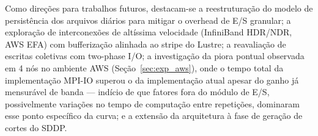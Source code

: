\documentclass[12pt]{article}
\begin{document}

Como direções para trabalhos futuros, destacam-se a reestruturação do modelo de persistência dos arquivos diários para mitigar o overhead de E/S granular; a exploração de interconexões de altíssima velocidade (InfiniBand HDR/NDR, AWS EFA) com bufferização alinhada ao stripe do Lustre; a reavaliação de escritas coletivas com two-phase I/O; a investigação da piora pontual observada em 4 nós no ambiente AWS (Seção~\ref{sec:exp_aws}), onde o tempo total da implementação MPI-IO superou o da implementação atual apesar do ganho já mensurável de banda — indício de que fatores fora do módulo de E/S, possivelmente variações no tempo de computação entre repetições, dominaram esse ponto específico da curva; e a extensão da arquitetura à fase de geração de cortes do SDDP.



\end{document}
